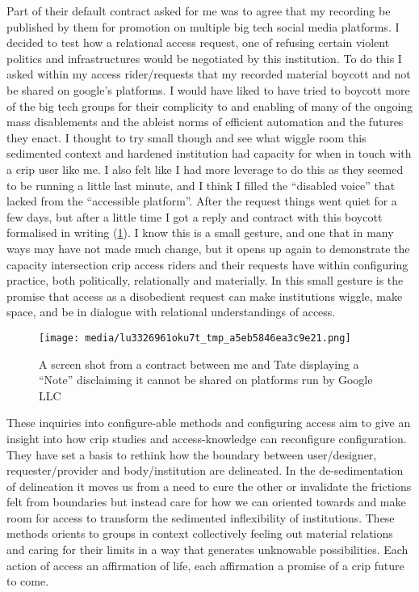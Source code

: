 Part of their default contract asked for me was to agree that my
recording be published by them for promotion on multiple big tech social
media platforms. I decided to test how a relational access request, one
of refusing certain violent politics and infrastructures would be
negotiated by this institution. To do this I asked within my access
rider/requests that my recorded material boycott and not be shared on
google's platforms. I would have liked to have tried to boycott more of
the big tech groups for their complicity to and enabling of many of the
ongoing mass disablements and the ableist norms of efficient automation
and the futures they enact. I thought to try small though and see what
wiggle room this sedimented context and hardened institution had
capacity for when in touch with a crip user like me. I also felt like I
had more leverage to do this as they seemed to be running a little last
minute, and I think I filled the ``disabled voice'' that lacked from the
``accessible platform''. After the request things went quiet for a few
days, but after a little time I got a reply and contract with this
boycott formalised in writing (\cref{fig:google}). I know this is a
small gesture, and one that in many ways may have not made much change,
but it opens up again to demonstrate the capacity intersection crip
access riders and their requests have within configuring practice, both
politically, relationally and materially. In this small gesture is the
promise that access as a disobedient request can make institutions
wiggle, make space, and be in dialogue with relational understandings of
access.

\begin{figure}
\hypertarget{fig:google}{%
\centering
\texttt{[image: media/lu3326961oku7t\_tmp\_a5eb5846ea3c9e21.png]}
\caption{A screen shot from a contract between me and Tate displaying a
``Note'' disclaiming it cannot be shared on platforms run by Google
LLC}\label{fig:google}
}
\end{figure}

These inquiries into configure-able methods and configuring access aim
to give an insight into how crip studies and access-knowledge can
reconfigure configuration. They have set a basis to rethink how the
boundary between user/designer, requester/provider and body/institution
are delineated. In the de-sedimentation of delineation it moves us from
a need to cure the other or invalidate the frictions felt from
boundaries but instead care for how we can oriented towards and make
room for access to transform the sedimented inflexibility of
institutions. These methods orients to groups in context collectively
feeling out material relations and caring for their limits in a way that
generates unknowable possibilities. Each action of access an affirmation
of life, each affirmation a promise of a crip future to come.

